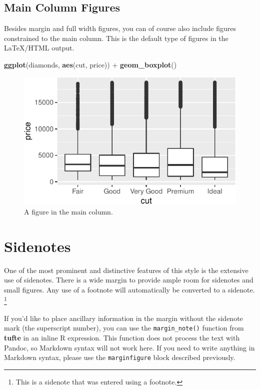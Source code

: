 \documentclass[]{tufte-handout}
\newenvironment{Shaded}{}{}
\newcommand{\KeywordTok}[1]{\textcolor[rgb]{0.00,0.44,0.13}{\textbf{#1}}}
\newcommand{\StringTok}[1]{\textcolor[rgb]{0.25,0.44,0.63}{#1}}
\newcommand{\OperatorTok}[1]{\textcolor[rgb]{0.40,0.40,0.40}{#1}}
\newcommand{\NormalTok}[1]{#1}
\begin{document}
\subsection{Main Column Figures}\label{main-column-figures}

Besides margin and full width figures, you can of course also include
figures constrained to the main column. This is the default type of
figures in the LaTeX/HTML output.

\begin{Shaded}
\begin{Highlighting}[]
\KeywordTok{ggplot}\NormalTok{(diamonds, }\KeywordTok{aes}\NormalTok{(cut, price)) }\OperatorTok{+}\StringTok{ }\KeywordTok{geom_boxplot}\NormalTok{()}
\end{Highlighting}
\end{Shaded}

\begin{figure}
\includegraphics{handout-twitter-analysis_files/figure-latex/fig-main-1} \caption[A figure in the main column]{A figure in the main column.}\label{fig:fig-main}
\end{figure}

\section{Sidenotes}\label{sidenotes}

One of the most prominent and distinctive features of this style is the
extensive use of sidenotes. There is a wide margin to provide ample room
for sidenotes and small figures. Any use of a footnote will
automatically be converted to a sidenote. \footnote{This is a sidenote
  that was entered using a footnote.}

If you'd like to place ancillary information in the margin without the
sidenote mark (the superscript number), you can use the
\texttt{margin\_note()} function from \textbf{tufte} in an inline R
expression.
This function does not process the text with Pandoc, so Markdown syntax
will not work here. If you need to write anything in Markdown syntax,
please use the \texttt{marginfigure} block described previously.
\end{document}
